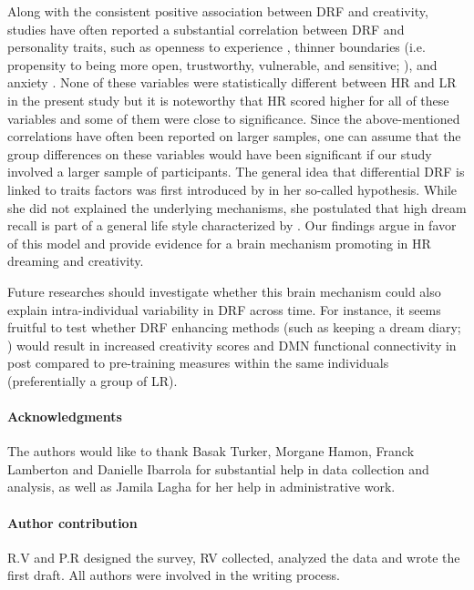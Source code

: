 Along with the consistent positive association between DRF and creativity, studies have often reported a substantial correlation between DRF and personality traits, such as openness to experience \citep{schredl_dream_2003}, thinner boundaries (i.e. propensity to being more open, trustworthy, vulnerable, and sensitive; \citealp{hartmann_boundaries_1989, schredl_dreaming_1996}), and anxiety \citep{schonbar_manifest_1959, tart_frequency_1962}. None of these variables were statistically different between HR and LR in the present study but it is noteworthy that HR scored higher for all of these variables and some of them were close to significance. Since the above-mentioned correlations have often been reported on larger samples, one can assume that the group differences on these variables would have been significant if our study involved a larger sample of participants. The general idea that differential DRF is linked to traits factors was first introduced by \citet{schonbar_differential_1965} in her so-called  hypothesis. While she did not explained the underlying mechanisms, she postulated that high dream recall is part of a general life style characterized by  \citep{schredl_dream_1999}. Our findings argue in favor of this model and provide evidence for a brain mechanism promoting in HR dreaming and creativity.

Future researches should investigate whether this brain mechanism could also explain intra-individual variability in DRF across time. For instance, it seems fruitful to test whether DRF enhancing methods (such as keeping a dream diary; \citealp{schredl_questionnaires_2002}) would result in increased creativity scores and DMN functional connectivity in post compared to pre-training measures within the same individuals (preferentially a group of LR).

\paragraph{Acknowledgments}
The authors would like to thank Basak Turker, Morgane Hamon, Franck Lamberton and Danielle Ibarrola for substantial help in data collection and analysis, as well as Jamila Lagha for her help in administrative work.

\paragraph{Author contribution}
R.V and P.R designed the survey, RV collected, analyzed the data and wrote the first draft. All authors were involved in the writing process.
